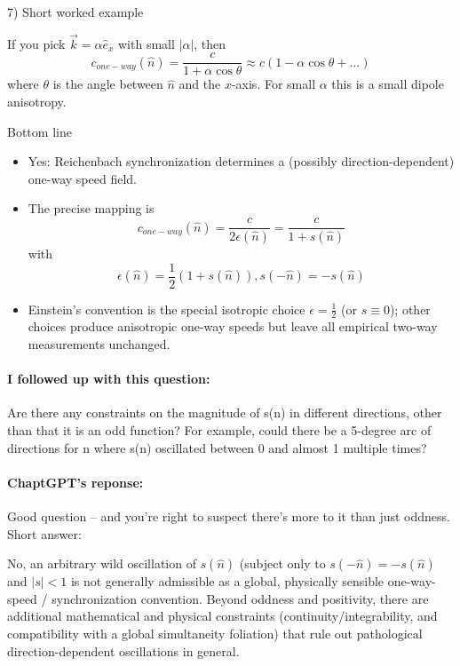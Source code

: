\documentclass[a4paper]{article}
\theoremstyle{plain}
\theoremstyle{definition}
\newcommand{\vect}[1]{\vec{#1}}
\newcommand{\hatvec}[1]{\hat{#1}}
\begin{document}
7) Short worked example

If you pick $\vect{k} = \alpha \hatvec{e}_x$ with small $|\alpha|$, then
\begin{equation}
c_{one-way}(\hatvec{n}) = \frac{c}{1 + \alpha \cos \theta} \approx c(1 - \alpha \cos \theta + ...)
\end{equation}
where $\theta$ is the angle between $\hatvec{n}$ and the $x$-axis.
For small $\alpha$ this is a small dipole anisotropy.

Bottom line

\begin{itemize}
\item Yes: Reichenbach synchronization determines a (possibly
  direction-dependent) one-way speed field.
\item The precise mapping is
\begin{equation}
c_{one-way}(\hatvec{n}) = \frac{c}{2\epsilon(\hatvec{n})} = \frac{c}{1+s(\hatvec{n})}
\end{equation}
with
\begin{equation}
\epsilon(\hatvec{n}) = \frac{1}{2}(1+s(\hatvec{n})), s(-\hatvec{n}) = -s(\hatvec{n})
\end{equation}
\item Einstein's convention is the special isotropic choice
  $\epsilon = \frac{1}{2}$ (or $s \equiv 0$); other choices produce
  anisotropic one-way speeds but leave all empirical two-way
  measurements unchanged.
\end{itemize}


\paragraph{I followed up with this question:}

Are there any constraints on the magnitude of s(n) in different
directions, other than that it is an odd function?  For example, could
there be a 5-degree arc of directions for n where s(n) oscillated
between 0 and almost 1 multiple times?


\paragraph{ChaptGPT's reponse:}

Good question -- and you're right to suspect there's more to it than
just oddness.  Short answer:

No, an arbitrary wild oscillation of $s(\hatvec{n})$
(subject only to $s(-\hatvec{n}) = -s(\hatvec{n})$
and $|s| < 1$
is not generally admissible as a global, physically sensible
one-way-speed / synchronization convention.  Beyond oddness and
positivity, there are additional mathematical and physical constraints
(continuity/integrability, and compatibility with a global
simultaneity foliation) that rule out pathological direction-dependent
oscillations in general.
\end{document}
